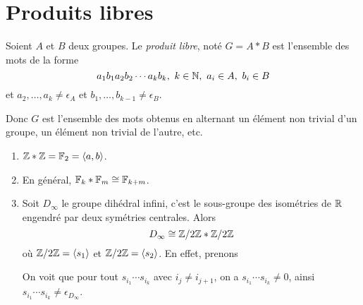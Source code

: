   \section{Produits libres}
  \label{sec:produits-libres}

  \begin{defi} 
    Soient $A$ et $B$ deux groupes. Le \emph{produit libre}, noté $G = A \ast B$ est l'ensemble des mots de la
    forme
      \[a_1b_1a_2b_2 \cdots a_kb_k,\ k \in \mathbb{N},\ a_i \in A,\ b_i \in B\]
    et $a_2, \ldots, a_k \neq \epsilon_A$ et $b_1, \ldots, b_{k-1} \neq \epsilon_B$. 
  \end{defi}

  Donc $G$ est l'ensemble des mots obtenus en alternant un élément non trivial d'un groupe, un élément non
  trivial de l'autre, etc.

  \begin{ex}
    \begin{enumerate}
    \item $\mathbb{Z} \ast \mathbb{Z} = \mathbb{F}_2 = \langle a, b \rangle$.

    \item En général, $\mathbb{F}_k \ast \mathbb{F}_m \cong \mathbb{F}_{k+m}$.

    \item Soit $D_\infty$ le groupe dihédral infini, c'est le sous-groupe des isométries de $\mathbb{R}$ engendré par
      deux symétries centrales. Alors
        \[D_\infty \cong \mathbb{Z}/2\mathbb{Z} \ast \mathbb{Z}/2\mathbb{Z}\]
      où $\mathbb{Z}/2\mathbb{Z} = \langle s_1 \rangle$ et $\mathbb{Z}/2\mathbb{Z} = \langle s_2 \rangle$. En effet, prenons
      \begin{center}
      \end{center}
      On voit que pour tout $s_{i_1} \cdots s_{i_k}$ avec $i_j \neq i_{j+1}$, on a $s_{i_1} \cdots s_{i_k}
      \neq 0$, ainsi $s_{i_1} \cdots s_{i_k} \neq \epsilon_{D_\infty}$.
    \end{enumerate}
  \end{ex}

